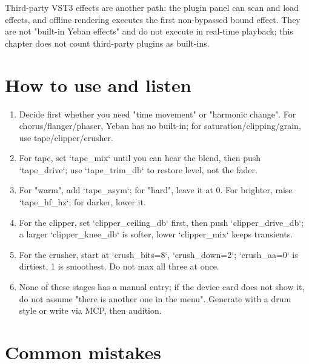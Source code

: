 Third-party VST3 effects are another path: the plugin panel can scan and load effects, and offline rendering executes the first non-bypassed bound effect. They are not "built-in Yeban effects" and do not execute in real-time playback; this chapter does not count third-party plugins as built-ins.

\section{How to use and listen}

\begin{enumerate}
  \item Decide first whether you need "time movement" or "harmonic change". For chorus/\allowbreak flanger/\allowbreak phaser, Yeban has no built-in; for saturation/clipping/grain, use tape/clipper/crusher.
  \item For tape, set `tape_mix` until you can hear the blend, then push `tape_drive`; use `tape_trim_db` to restore level, not the fader.
  \item For "warm", add `tape_asym`; for "hard", leave it at 0. For brighter, raise `tape_hf_hz`; for darker, lower it.
  \item For the clipper, set `clipper_ceiling_db` first, then push `clipper_drive_db`; a larger `clipper_knee_db` is softer, lower `clipper_mix` keeps transients.
  \item For the crusher, start at `crush_bits=8`, `crush_down=2`; `crush_aa=0` is dirtiest, 1 is smoothest. Do not max all three at once.
  \item None of these stages has a manual entry; if the device card does not show it, do not assume "there is another one in the menu". Generate with a drum style or write via MCP, then audition.
\end{enumerate}



\section{Common mistakes}

